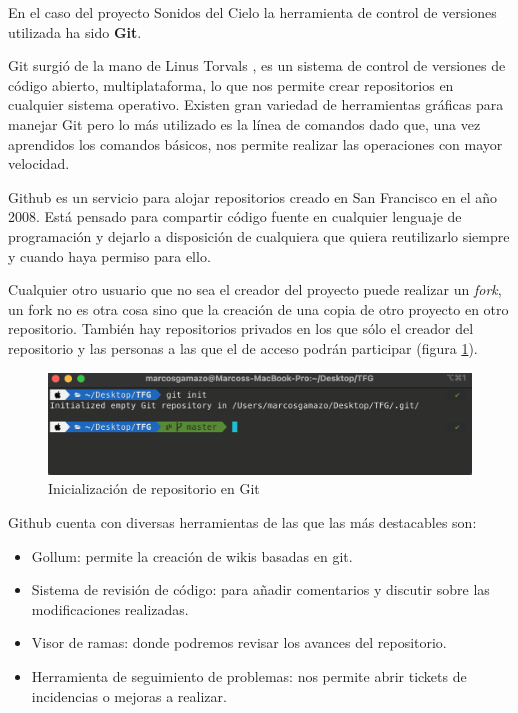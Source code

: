 En el caso del proyecto Sonidos del Cielo la herramienta de control de versiones utilizada ha sido \textbf{Git}. 

Git surgió de la mano de Linus Torvals \cite{torvalds2005git}, es un sistema de control de versiones de código abierto, multiplataforma, lo que nos permite crear repositorios en cualquier sistema operativo. Existen gran variedad de herramientas gráficas para manejar Git pero lo más utilizado es la línea de comandos dado que, una vez aprendidos los comandos básicos, nos permite realizar las operaciones con mayor velocidad. 

Github es un servicio para alojar repositorios creado en San Francisco en el año 2008. Está pensado para compartir código fuente en cualquier lenguaje de programación y dejarlo a disposición de cualquiera que quiera reutilizarlo siempre y cuando haya permiso para ello. 

Cualquier otro usuario que no sea el creador del proyecto puede realizar un \textit{fork}, un fork no es otra cosa sino que la creación de una copia de otro proyecto en otro repositorio.
También hay repositorios privados en los que sólo el creador del repositorio y las personas a las que el de acceso podrán participar (figura \ref{fig:git_init}).

\begin{figure}[h]
    \centering
    \includegraphics[width=\textwidth]{include/capturas/gitInit.png}
    \caption{Inicialización de repositorio en Git}
    \label{fig:git_init}
\end{figure}


Github cuenta con diversas herramientas de las que las más destacables son:

\begin{itemize}
    \item Gollum: permite la creación de wikis basadas en git.
    \item Sistema de revisión de código: para añadir comentarios y discutir sobre las modificaciones realizadas.
    \item Visor de ramas: donde podremos revisar los avances del repositorio.
    \item Herramienta de seguimiento de problemas: nos permite abrir tickets de incidencias o mejoras a realizar.
\end{itemize}

